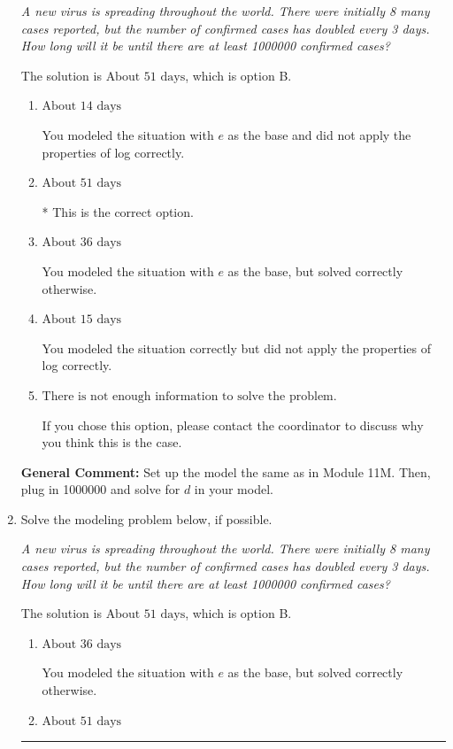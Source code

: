 \documentclass{extbook}[14pt]
\newcommand{\litem}[1]{\item #1

\rule{\textwidth}{0.4pt}}
\begin{document}
\begin{enumerate}
{\begin{center}
    \textit{ A new virus is spreading throughout the world. There were initially 8 many cases reported, but the number of confirmed cases has doubled every 3 days. How long will it be until there are at least 1000000 confirmed cases? }
\end{center}
The solution is \( \text{About } 51 \text{ days} \), which is option B.\begin{enumerate}[label=\Alph*.]
\item \( \text{About } 14 \text{ days} \)

You modeled the situation with $e$ as the base and did not apply the properties of log correctly.
\item \( \text{About } 51 \text{ days} \)

* This is the correct option.
\item \( \text{About } 36 \text{ days} \)

You modeled the situation with $e$ as the base, but solved correctly otherwise.
\item \( \text{About } 15 \text{ days} \)

You modeled the situation correctly but did not apply the properties of log correctly.
\item \( \text{There is not enough information to solve the problem.} \)

If you chose this option, please contact the coordinator to discuss why you think this is the case.
\end{enumerate}

\textbf{General Comment:} Set up the model the same as in Module 11M. Then, plug in 1000000 and solve for $d$ in your model.
}
\litem{
Solve the modeling problem below, if possible.

\begin{center}
    \textit{ A new virus is spreading throughout the world. There were initially 8 many cases reported, but the number of confirmed cases has doubled every 3 days. How long will it be until there are at least 1000000 confirmed cases? }
\end{center}
The solution is \( \text{About } 51 \text{ days} \), which is option B.\begin{enumerate}[label=\Alph*.]
\item \( \text{About } 36 \text{ days} \)

You modeled the situation with $e$ as the base, but solved correctly otherwise.
\item \( \text{About } 51 \text{ days} \)


\end{enumerate}}
\end{enumerate}
\end{document}
